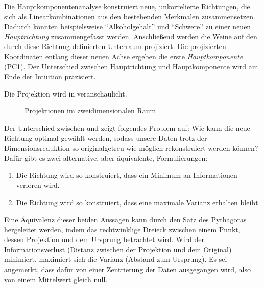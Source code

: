 Die Hauptkomponentenanalyse konstruiert neue, unkorrelierte Richtungen, die sich als Linearkombinationen aus den bestehenden Merkmalen zusammensetzen.
Dadurch könnten beispielsweise \enquote{Alkoholgehalt} und \enquote{Schwere} zu einer neuen \emph{Hauptrichtung} zusammengefasst werden.
Anschließend werden die Weine auf den durch diese Richtung definierten Unterraum projiziert.
Die projizierten Koordinaten entlang dieser neuen Achse ergeben die erste \emph{Hauptkomponente} (PC1).
Der Unterschied zwischen Hauptrichtung und Hauptkomponente wird am Ende der Intuition präzisiert.

Die Projektion wird in  veranschaulicht.
\begin{figure}[bt]
    \centering
    \begin{subfigure}{\textwidth}
        \centering
        \caption{}\label{fig:pca2d1}
        
        \hspace{20pt}
        
    \end{subfigure}
    \begin{subfigure}{\textwidth}
        \centering
        \caption{}\label{fig:pca2d2}
        
        \hspace{20pt}
        
    \end{subfigure}
    \caption{Projektionen im zweidimensionalen Raum}\label{fig:pca2d}
\end{figure}
Der Unterschied zwischen  und  zeigt folgendes Problem auf:
Wie kann die neue Richtung optimal gewählt werden, sodass unsere Daten trotz der Dimensionsreduktion so originalgetreu wie möglich rekonstruiert werden können?
Dafür gibt es zwei alternative, aber äquivalente, Formulierungen:
\enlargethispage{\baselineskip} 
\begin{enumerate}
    \item Die Richtung wird so konstruiert, dass ein Minimum an Informationen verloren wird.
    \item Die Richtung wird so konstruiert, dass eine maximale Varianz erhalten bleibt.
\end{enumerate}
Eine Äquivalenz dieser beiden Aussagen kann durch den Satz des Pythagoras hergeleitet werden, indem das rechtwinklige Dreieck zwischen einem Punkt, dessen Projektion und dem Ursprung betrachtet wird. 
Wird der Informationsverlust (Distanz zwischen der Projektion und dem Original) minimiert, maximiert sich die Varianz (Abstand zum Ursprung).
Es sei angemerkt, dass dafür von einer Zentrierung der Daten ausgegangen wird, also von einem Mittelwert gleich null.

